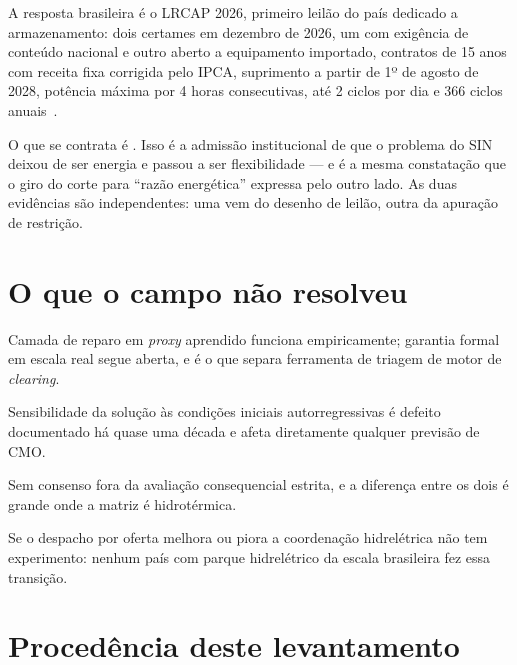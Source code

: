 \documentclass[10pt,a4paper,oneside]{book}
\begin{document}
A resposta brasileira é o LRCAP 2026, primeiro leilão do país dedicado a
armazenamento: dois certames em dezembro de 2026, um com exigência de conteúdo
nacional e outro aberto a equipamento importado, contratos de 15 anos com
receita fixa corrigida pelo IPCA, suprimento a partir de 1º de agosto de 2028,
potência máxima por 4 horas consecutivas, até 2 ciclos por dia e 366 ciclos
anuais~\cite{epe2026,bess2026}.

O que se contrata é .
Isso é a admissão institucional de que o problema do SIN deixou de ser energia e
passou a ser flexibilidade --- e é a mesma constatação que o giro do corte para
``razão energética'' expressa pelo outro lado. As duas evidências são
independentes: uma vem do desenho de leilão, outra da apuração de restrição.

\section*{O que o campo não resolveu}

\begin{ficha}
\item[Viabilidade] Camada de reparo em \emph{proxy} aprendido funciona
  empiricamente; garantia formal em escala real segue aberta, e é o que separa
  ferramenta de triagem de motor de \emph{clearing}.
\item[Dual do SDDP] Sensibilidade da solução às condições iniciais
  autorregressivas é defeito documentado há quase uma década e afeta
  diretamente qualquer previsão de CMO.
\item[Marginal ou médio] Sem consenso fora da avaliação consequencial estrita,
  e a diferença entre os dois é grande onde a matriz é hidrotérmica.
\item[Oferta e hidro] Se o despacho por oferta melhora ou piora a coordenação
  hidrelétrica não tem experimento: nenhum país com parque hidrelétrico da
  escala brasileira fez essa transição.
\end{ficha}

\section*{Procedência deste levantamento}
\end{document}
